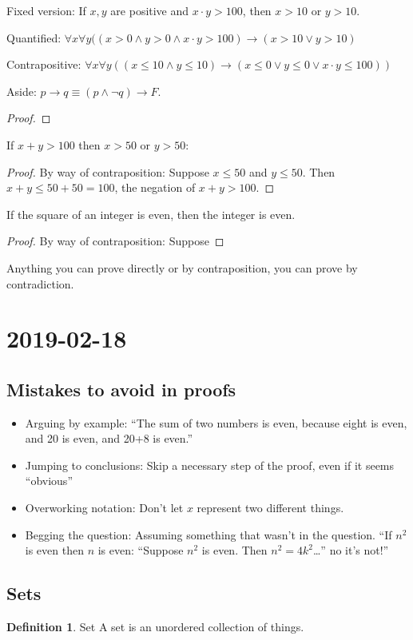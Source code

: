 \documentclass{article}
\theoremstyle{definition}
\newtheorem{definition}{Definition}[section]
\begin{document}
Fixed version: If $x, y$ are positive and $x \cdot y > 100$, then $x > 10$ or
$y > 10$.

Quantified: $\forall x \forall y ( ( x > 0 \land y > 0 \land x \cdot y > 100 )
\to ( x > 10 \lor y > 10)$

Contrapositive: $\forall x \forall y ( ( x \leq 10 \land y \leq 10 ) \to
( x \leq 0 \lor y \leq 0 \lor x \cdot y \leq 100) ) $

Aside: $p \to q \equiv (p \land \neg q) \to F$.

\begin{proof}
\end{proof}

If $x+y > 100$ then $x > 50$ or $y > 50$:
\begin{proof}
  By way of contraposition: Suppose $x \leq 50$ and $y \leq 50$. Then
  $x + y \leq 50 + 50 = 100$, the negation of $x+y > 100$.
\end{proof}

If the square of an integer is even, then the integer is even.
\begin{proof}
  By way of contraposition: 
  Suppose
\end{proof}

Anything you can prove directly or by contraposition, you can prove by
contradiction.

\section*{2019-02-18}
\subsection*{Mistakes to avoid in proofs}
\begin{itemize}
  \item Arguing by example: ``The sum of two numbers is even, because eight is even, and 20 is even, and 20+8 is even.''
  \item Jumping to conclusions: Skip a necessary step of the proof, even if it seems ``obvious''
  \item Overworking notation: Don't let $x$ represent two different things.
  \item Begging the question: Assuming something that wasn't in the question.
    ``If $n^2$ is even then $n$ is even: ``Suppose $n^2$ is even. Then $n^2=4k^2$\dots''
     no it's not!''
\end{itemize}

\subsection*{Sets}
\begin{definition}{Set}
  A set is an unordered collection of things.
\end{definition}
\end{document}
